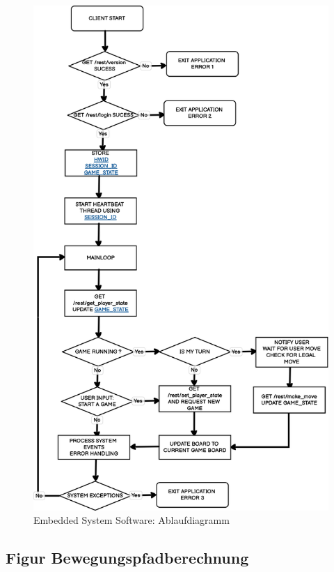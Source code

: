 \begin{figure}
\centering
\includegraphics{images/ATC_gameclient_statemachiene.png}
\caption{Embedded System Software: Ablaufdiagramm}
\end{figure}

\hypertarget{figur-bewegungspfadberechnung}{%
\subsection{Figur
Bewegungspfadberechnung}\label{figur-bewegungspfadberechnung}}


